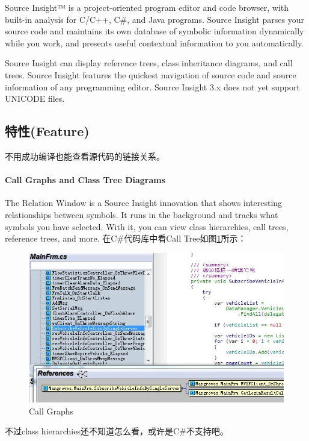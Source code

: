 \documentclass{book}
\begin{document}
Source Insight™ is a project-oriented program editor and code browser, 
with built-in analysis for C/C++, C\#, and Java programs. 
Source Insight parses your source code and maintains its 
own database of symbolic information dynamically while you work, 
and presents useful contextual information to you automatically.

Source Insight can display reference trees, class inheritance diagrams, 
and call trees. Source Insight features the quickest navigation of source 
code and source information of any programming editor.
Source Insight 3.x does not yet support UNICODE files.

\subsection{特性(Feature)}

不用成功编译也能查看源代码的链接关系。

\paragraph{Call Graphs and Class Tree Diagrams}

The Relation Window is a Source Insight innovation that 
shows interesting relationships between symbols. 
It runs in the background and tracks what symbols you have selected. 
With it, you can view class hierarchies, call trees, reference trees, and more.
在C\#代码库中看Call Tree如图\ref{fig:FunctionTree}所示：

\begin{figure}[htbp]
	\centering
	\includegraphics[scale=0.8]{FunctionTree.jpg}
	\caption{Call Graphs}
	\label{fig:FunctionTree}
\end{figure}

不过class hierarchies还不知道怎么看，或许是C\#不支持吧。
\end{document}
